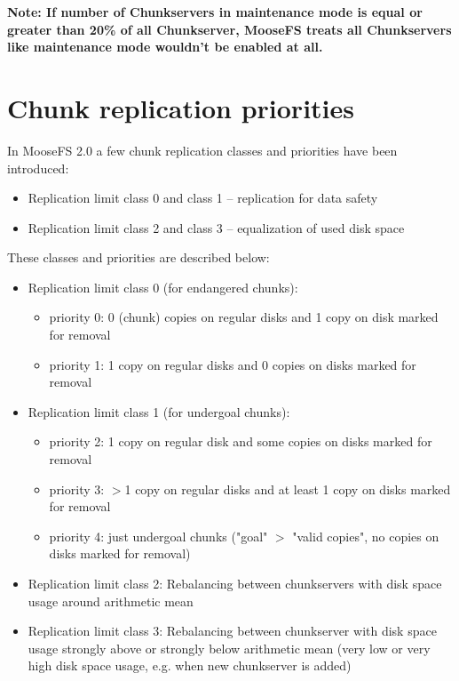 \documentclass[a4paper,11pt,english]{report}
\begin{document}
		\bigskip

		\textbf{Note: If number of Chunkservers in maintenance mode is equal or greater than 20\% of all Chunkserver, MooseFS treats all Chunkservers like maintenance mode wouldn't be enabled at all.}
		
		\section{Chunk replication priorities}
		In MooseFS 2.0 a few chunk replication classes and priorities have been introduced:
		\begin{itemize}
			\item Replication limit class 0 and class 1 -- replication for data safety
			\item Replication limit class 2 and class 3 -- equalization of used disk space
		\end{itemize}
		
		\bigskip
		\bigskip
		These classes and priorities are described below:		
		\bigskip		
		
		\begin{itemize}
			\item Replication limit class 0 (for endangered chunks):
				\begin{itemize}
					\item priority 0: 0 (chunk) copies on regular disks and 1 copy on disk marked for removal
					\item priority 1: 1 copy on regular disks and 0 copies on disks marked for removal
				\end{itemize}
				
			\item Replication limit class 1 (for undergoal chunks):
				\begin{itemize}
					\item priority 2: 1 copy on regular disk and some copies on disks marked for removal
					\item priority 3: $>$1 copy on regular disks and at least 1 copy on disks marked for removal
					\item priority 4: just undergoal chunks ("goal" $>$ "valid copies", no copies on disks marked for removal)
				\end{itemize}
				
			\item Replication limit class 2: Rebalancing between chunkservers with disk space usage around arithmetic mean
			\item Replication limit class 3: Rebalancing between chunkserver with disk space usage strongly above or strongly below arithmetic mean (very low or very high disk space usage, e.g. when new chunkserver is added)
		\end{itemize}
		
\end{document}
